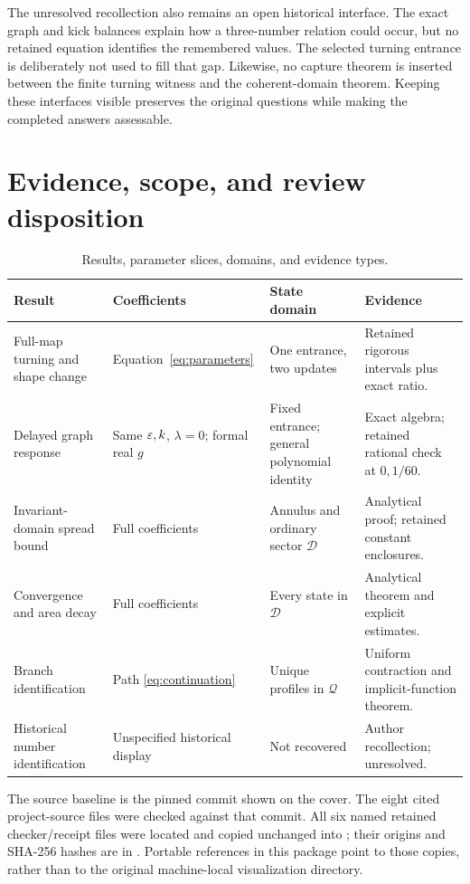 \documentclass[11pt,a4paper]{article}
\numberwithin{equation}{section}
\theoremstyle{remark}\newtheorem{remark}[theorem]{Remark}
\begin{document}
The unresolved recollection also remains an open historical interface. The exact graph and kick balances explain how a three-number relation could occur, but no retained equation identifies the remembered values. The selected turning entrance is deliberately not used to fill that gap. Likewise, no capture theorem is inserted between the finite turning witness and the coherent-domain theorem. Keeping these interfaces visible preserves the original questions while making the completed answers assessable.

\section{Evidence, scope, and review disposition}\label{sec:evidence}

\begin{table}[htbp]\centering\small
\caption{Results, parameter slices, domains, and evidence types.}
\begin{tabularx}{\textwidth}{@{}L{.22\textwidth}L{.21\textwidth}YY@{}}\toprule
Result & Coefficients & State domain & Evidence\\\midrule
Full-map turning and shape change & Equation~\eqref{eq:parameters} & One entrance, two updates & Retained rigorous intervals plus exact ratio.\\
Delayed graph response & Same $\varepsilon,k$, $\lambda=0$; formal real $g$ & Fixed entrance; general polynomial identity & Exact algebra; retained rational check at $0,1/60$.\\
Invariant-domain spread bound & Full coefficients & Annulus and ordinary sector $\mathcal D$ & Analytical proof; retained constant enclosures.\\
Convergence and area decay & Full coefficients & Every state in $\mathcal D$ & Analytical theorem and explicit estimates.\\
Branch identification & Path \eqref{eq:continuation} & Unique profiles in $\mathcal Q$ & Uniform contraction and implicit-function theorem.\\
Historical number identification & Unspecified historical display & Not recovered & Author recollection; unresolved.\\\bottomrule
\end{tabularx}
\end{table}

The source baseline is the pinned commit shown on the cover. The eight cited project-source files were checked against that commit. All six named retained checker/receipt files were located and copied unchanged into ; their origins and SHA-256 hashes are in . Portable references in this package point to those copies, rather than to the original machine-local visualization directory.
\end{document}
